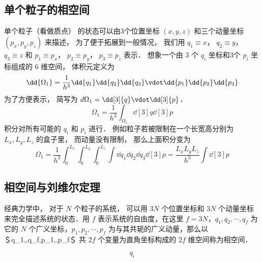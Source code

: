 
\begin{issues}
\issueDraft
\end{issues}

\subsection{单个粒子的相空间}

单个粒子（看做质点） 的状态可以由3个位置坐标 $(x,y,z)$ 和三个动量坐标 $(p_x, p_y, p_z)$ 来描述， 为了便于拓展到一般情况， 我们用 $q_1 \equiv x$，   $q_2 \equiv y$， $q_3 \equiv z$   和 $p_1 \equiv p_x$， $p_2 \equiv p_y$， $p_3 \equiv p_z$ 表示． 想象一个由 3 个 $q_i$  坐标和3个 $p_i$  坐标组成的 $6$ 维空间， 体积元定义为
\begin{equation}
\dd{\Omega_1} = \frac{1}{h^3} \dd{q_1}\dd{q_2}\dd{q_3} \vdot \dd{p_1}\dd{p_2}\dd{p_3}
\end{equation} 
为了方便表示， 简写为  $d{\Omega_1} = \dd[3]{q} \vdot \dd[3]{p}$． 
\begin{equation}
\Omega_1 = \frac{1}{h^3} \int_{\Omega_1} \dd[3]{q} \dd[3]{p}
\end{equation} 
积分对所有可能的 $q_i$ 和 $p_i$ 进行． 例如粒子若被限制在一个长宽高分别为 $L_x, L_y, L_z$ 的盒子里， 而动量没有限制， 那么上面积分变为
\begin{equation}
\Omega_1 = \frac{1}{h^3} \int_0^{L_x} \int_0^{L_y} \int_0^{L_z} \int \dd{q_1} \dd{q_2} \dd{q_3} \dd[3]{p} = \frac{L_x L_y L_z}{h^3} \int \dd[3]{p} 
\end{equation} 

\subsection{相空间与刘维尔定理}
经典力学中， 对于 $N$ 个粒子的系统， 可以用 $3N$ 个位置坐标和 $3N$ 个动量坐标来完全描述系统的状态．用 $f$ 表示系统的自由度，在这里 $f=3N$，$q_1,q_2,\cdots,q_f$ 为它的 $N$ 个广义坐标，$p_1,p_2,\cdots,p_f$ 为与其共轭的广义动量，那么以　＄q_1,\cdots,q_f,p_1,\cdots,p_f＄ 共 $2f$ 个变量为直角坐标构成的 $2f$ 维空间称为相空间．



\begin{equation}
q_i
\end{equation}